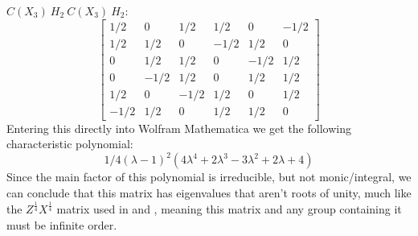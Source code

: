 $C(X_3)\ H_2\ C(X_3)\ H_2$:
\[\left[\begin{matrix}
1/2 & 0 & 1/2 & 1/2 & 0 & -1/2\\
1/2 & 1/2 & 0 & -1/2 & 1/2 & 0\\
0 & 1/2 & 1/2 & 0 & -1/2 & 1/2\\
0 & -1/2 & 1/2 & 0 & 1/2 & 1/2\\
1/2 & 0 & -1/2 & 1/2 & 0 & 1/2\\
-1/2 & 1/2 & 0 & 1/2 & 1/2 & 0
\end{matrix}\right]\]
Entering this directly into Wolfram Mathematica we get the following characteristic polynomial:
\[1/4 (\lambda - 1)^2 (4 \lambda^4 + 2 \lambda^3 - 3 \lambda^2 + 2 \lambda + 4)\]
Since the main factor of this polynomial is irreducible, but not monic/integral, we can conclude that this matrix has eigenvalues that aren't roots of unity, much like the $Z^{\frac{1}{4}}X^{\frac{1}{4}}$ matrix used in \cite{universal-qubit} and \cite{algos}, meaning this matrix and any group containing it must be infinite order.



